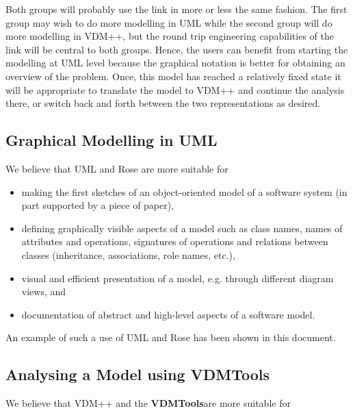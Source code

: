 \documentclass[\pformat,12pt,twoside]{article}
\newcommand{\vdmtools}{\textbf{VDMTools}}
\begin{document}
Both groups will probably use the link in more or less the same 
fashion. The first group may wish to do more modelling in UML 
while the second group will do more modelling in VDM++, but the 
round trip engineering capabilities of the link will be central 
to both groups. Hence, the users can benefit from starting the 
modelling at UML level because the graphical notation is better 
for obtaining an overview of the problem. Once, this model has 
reached a relatively fixed state it will be appropriate to translate 
the model to VDM++ and continue the analysis there, or switch 
back and forth between the two representations as desired. 

\subsection{Graphical Modelling in UML}

We believe that UML and Rose are more suitable for 
\begin{itemize}
\item
making the first sketches of an object-oriented model of a software 
system (in part supported by a piece of paper), 
\item
defining graphically visible aspects of a model such as class 
names, names of attributes and operations, signatures of operations 
and relations between classes (inheritance, associations, role 
names, etc.), 
\item
visual and efficient presentation of a model, e.g. through different 
diagram views, and
\item
documentation of abstract and high-level aspects of a software 
model.
\end{itemize}


An example of such a use of UML and Rose has been shown in this 
document.

\subsection{Analysing a Model using \vdmtools}

We believe that VDM++ and the \vdmtools are more suitable for
\end{document}
